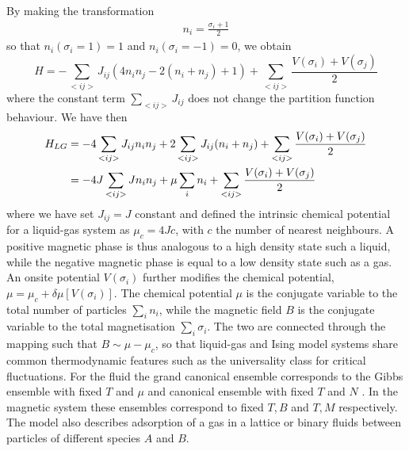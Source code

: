 By making the transformation\cite{goldenfeld_lectures_2018} 
\begin{align}
    n_i =  \frac{\sigma_i +1}{2}
\end{align}
so that $n_i(\sigma_i = 1) = 1$ and $n_i(\sigma_i = -1) = 0$, we obtain
\begin{equation}
	H =  - \sum_{< i j >}  J_{ij} \left( 4 n_i n_j -2 ( n_i+n_j) + 1 \right)+ \sum_{< i j >}  \frac{V(\sigma_i)+V(\sigma_j)}{2}  
\end{equation}
where the constant term $\sum_{< i j >}  J_{ij}$ does not change the partition function behaviour. We have then
\begin{align}
	H_{LG} &=  - 4 \sum_{< i j >}  J_{ij}  n_i n_j  + 2 \sum_{< i j >}  J_{ij}  (n_i+n_j) + \sum_{< i j >}  \frac{V(\sigma_i)+V(\sigma_j)}{2}  \nonumber \\
       &=  - 4 J \sum_{< i j >}  J n_i n_j  + \mu \sum_i  n_i + \sum_{< i j >}   \frac{V(\sigma_i)+V(\sigma_j)}{2}  
\end{align}
where we have set $J_{ij} = J$ constant and defined the intrinsic chemical potential for a liquid-gas system as $\mu_c=4J c$, with  $c$ the number of nearest neighbours. A positive magnetic phase is thus analogous to a high density state such a liquid, while the negative magnetic phase is equal to a low density state such as a gas. An onsite potential $V(\sigma_i)$ further modifies the chemical potential, $\mu=\mu_c+\delta\mu[V(\sigma_i)]$.
The chemical potential $\mu$ is the conjugate variable to the total number of particles $\sum_i n_i$, while the magnetic field $B$ is the conjugate variable to the total magnetisation $\sum_i \sigma_i$. The two are connected through the mapping such that $B\sim \mu-\mu_c$, so that liquid-gas and Ising model systems share common thermodynamic features such as the universality class for critical fluctuations. For the fluid the grand canonical ensemble corresponds to the Gibbs ensemble with fixed $T$ and $\mu$ and canonical ensemble with fixed $T$ and $N$ . In the magnetic system these ensembles correspond to fixed $T, B$ and $T,M$ respectively. The model also describes adsorption of a gas in a lattice or binary fluids between particles of different species $A$ and $B$.




